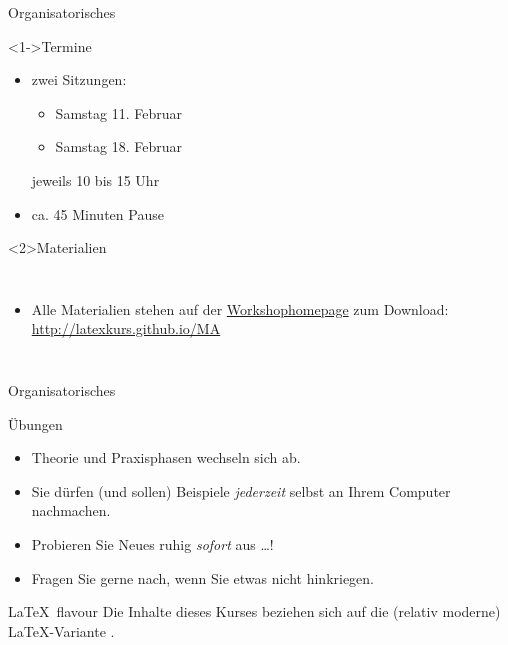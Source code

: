 \documentclass[
	vorläufig=false,
	datum=2017-02-11,
	datum1=2017-02-11,
	datum2=2017-02-25,
	titel={erster Tag},
	web=false,
	kursA,
]{../tex/latexkurs-slides}
\begin{document}
\begin{frame}[t]{Organisatorisches}%
	\begin{block}<1->{Termine}
		\begin{itemize}
			\item	 zwei Sitzungen:
			\begin{itemize}
				\iftrue
				\item Samstag 11. Februar
				\item Samstag 18. Februar
				\else
				\item Samstag 25. Februar
				\item Samstag \phantom24. März
				\fi
			\end{itemize}
			jeweils 10 bis 15 Uhr
			\item ca. 45 Minuten Pause
		\end{itemize}
	\end{block}
	\begin{block}{Materialien}
		\begin{columns}
				\begin{itemize}
					\item Alle Materialien stehen auf der \href{http://latexkurs.github.io/MA}{Workshophomepage} zum Download:\\[1ex]
					\url{http://latexkurs.github.io/MA}\\\quad
				\end{itemize}
				\vspace*{-2mm}
				
				\begin{minipage}{1.05in}
					\centering
					\textcolor{white}{\rule{0.9in}{0.9in}}\vspace*{-0.86in}
				\end{minipage}
			\end{columns}
	\end{block}
\end{frame}

\begin{frame}[t]{Organisatorisches}
	\begin{block}{Übungen}
		\begin{itemize}
			\item Theorie und Praxisphasen wechseln sich ab.
			\item Sie dürfen (und sollen) Beispiele \emph{jederzeit} selbst an Ihrem Computer nachmachen.
			\item Probieren Sie Neues ruhig \emph{sofort} aus …!
			\item Fragen Sie gerne nach, wenn Sie etwas nicht hinkriegen.
		\end{itemize}
	\end{block}
	\begin{block}{\LaTeX\ flavour}
		Die Inhalte dieses Kurses beziehen sich auf die (relativ moderne) \LaTeX-Variante .
	\end{block}
\end{frame}
\end{document}

